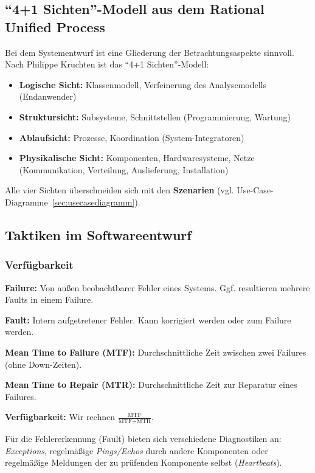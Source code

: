 \documentclass[a4paper,parskip=half*,DIV=7,fontsize=11pt]{scrartcl}
\begin{document}
\subsection{``4+1 Sichten''-Modell aus dem Rational Unified Process}

Bei dem Systementwurf ist eine Gliederung der Betrachtungsaspekte sinnvoll. Nach Philippe Kruchten ist das ``4+1 Sichten''-Modell:

\begin{itemize}
\item \textbf{Logische Sicht:} Klassenmodell, Verfeinerung des Analysemodells (Endanwender)
\item \textbf{Struktursicht:} Subsysteme, Schnittstellen (Programmierung, Wartung)
\item \textbf{Ablaufsicht:} Prozesse, Koordination (System-Integratoren)
\item \textbf{Physikalische Sicht:} Komponenten, Hardwaresysteme, Netze (Kommunikation, Verteilung, Auslieferung, Installation)
\end{itemize}

Alle vier Sichten überschneiden sich mit den \textbf{Szenarien} (vgl. Use-Case-Diagramme~\ref{sec:usecasediagramm}).

\subsection{Taktiken im Softwareentwurf}

\subsubsection{Verfügbarkeit}

\textbf{Failure:} Von außen beobachtbarer Fehler eines Systems. Ggf. resultieren mehrere Faults in einem Failure.

\textbf{Fault:} Intern aufgetretener Fehler. Kann korrigiert werden oder zum Failure werden.

\textbf{Mean Time to Failure (MTF):} Durchschnittliche Zeit zwischen zwei Failures (ohne Down-Zeiten).

\textbf{Mean Time to Repair (MTR):} Durchschnittliche Zeit zur Reparatur eines Failures.

\textbf{Verfügbarkeit:} Wir rechnen $\frac{\textrm{MTF}}{\textrm{MTF}+\textrm{MTR}}$.

Für die Fehlererkennung (Fault) bieten sich verschiedene Diagnostiken an: \emph{Exceptions}, regelmäßige \emph{Pings/Echos} durch andere Komponenten oder regelmäßige Meldungen der zu prüfenden Komponente selbst (\emph{Heartbeats}).
\end{document}
